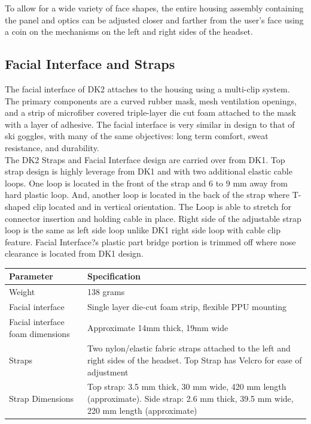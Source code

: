 \documentclass[letterpaper]{article}
\begin{document}
To allow for a wide variety of face shapes, the entire housing assembly containing the panel and optics can be adjusted closer and farther from the user's face using a coin on the mechanisms on the left and right sides of the headset.

\subsection{Facial Interface and Straps}
The facial interface of DK2 attaches to the housing using a multi-clip system. The primary components are a curved rubber mask, mesh ventilation openings, and a strip of microfiber covered triple-layer die cut foam attached to the mask with a layer of adhesive. The facial interface is very similar in design to that of ski goggles, with many of the same objectives: long term comfort, sweat resistance, and durability. \\

The DK2 Straps and Facial Interface design are carried over from DK1. Top strap design is highly leverage from DK1 and with two additional elastic cable loops. One loop is located in the front of the strap and 6 to 9 mm away from hard plastic loop. And, another loop is located in the back of the strap where T-shaped clip located and in vertical orientation. The Loop is able to stretch for connector insertion and holding cable in place. Right side of the adjustable strap loop is the same as left side loop unlike DK1 right side loop with cable clip feature.
Facial Interface?s plastic part bridge portion is trimmed off where nose clearance is located from DK1 design.

\begin{center}
    \begin{tabular}{ | l | p{8cm} |}
    \hline
    \cellcolor{lightgray} Parameter & \cellcolor{lightgray} Specification \\ \hline
    Weight & 138 grams \\ \hline
    Facial interface & Single layer die-cut foam strip, flexible PPU mounting \\ \hline
    Facial interface foam dimensions & Approximate 14mm thick, 19mm wide \\ \hline
    Straps & Two nylon/elastic fabric straps attached to the left and right sides of the headset. Top Strap has Velcro for ease of adjustment \\ \hline
    Strap Dimensions & Top strap: 3.5 mm thick, 30 mm wide, 420 mm length (approximate).
Side strap: 2.6 mm thick, 39.5 mm wide, 220 mm length (approximate) \\ \hline
    \end{tabular}
\end{center}
\end{document}

